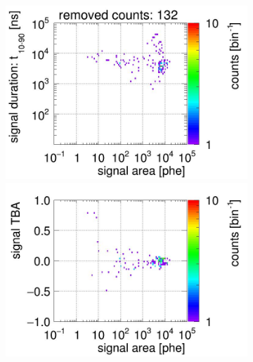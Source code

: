 \begin{landscape}
\begin{figure}[!p]
\begin{subfigure}[t]{0.33\textwidth}
			\includegraphics[width=\figurewidth,clip,trim={0 98 0 10}]{Figures/GasTest/CutsValid/res64767/pdpaX09Vecfig64767.jpg}
			\includegraphics[width=\figurewidth,clip,trim={0 0 0 40}]{Figures/GasTest/CutsValid/res64767/tbapaX09Vecfig64767.jpg}
			\caption{}
			\label{fig:signal selection 09}
		\end{subfigure}
		\begin{subfigure}[t]{0.33\textwidth}
			\centering

\end{subfigure}
\end{figure}
\end{landscape}
